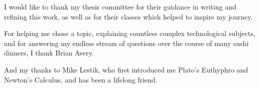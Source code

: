 \noindent I would like to thank my thesis committee for their guidance in writing and refining this work, as well as for their classes which helped to inspire my journey.

\vspace{1cm}

\noindent For helping me chose a topic, explaining countless complex technological subjects, and for answering my endless stream of questions over the course of many sushi dinners, I thank Brian Avery.

\vspace{1cm}

\noindent And my thanks to Mike Lestik, who first introduced me Plato's Euthyphro and Newton's Calculus, and has been a lifelong friend.
